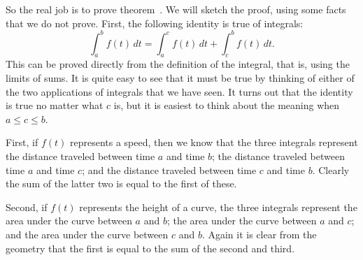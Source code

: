 \begin{theorem}
So the real job is to prove
theorem~. We will sketch the proof,
using some facts that we do not prove. First, the following identity
is true of integrals:
$$
  \int_a^b f(t)\,dt = \int_a^c f(t)\,dt + \int_c^b f(t)\,dt.
$$
This can be proved directly from the definition of the integral, that
is, using the limits of sums. It is quite easy to see that it must be
true by thinking of either of the two applications of integrals that
we have seen. It turns out that the identity is true no matter what
$c$ is, but it is easiest to think about the meaning when 
$a\le c\le b$.

First, if $f(t)$ represents a speed, then we know that the three
integrals represent the distance traveled between time $a$ and time $b$;
the distance traveled between time $a$ and time $c$; and 
the distance traveled between time $c$ and time $b$. Clearly the sum of
the latter two is equal to the first of these.

Second, if $f(t)$ represents the height of a curve, the three
integrals represent the area under the curve between $a$ and $b$;
the area under the curve between $a$ and $c$;
and the area under the curve between $c$ and $b$. Again it is clear
from the geometry that the first is equal to the sum of the second and
third. 



\end{theorem}
